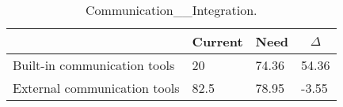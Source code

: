 
  \begin{table*}[]
  \centering
  \notsotiny
  \caption{ Communication__Integration.}
\label{tab:communication__integration}
\begin{tabular}{|l|l|l|l|}
  \hline
  \rowcolor[HTML]{C0C0C0}
    \multicolumn{1}{|c|}{Feature} & \multicolumn{1}{c|}{Current} & \multicolumn{1}{c|}{Need} & \multicolumn{1}{c|}{$\Delta$} \\ \hline
  Built-in communication tools & 20 & 74.36 & 54.36 \\ \hline 
External communication tools & 82.5 & 78.95 & -3.55 \\ \hline 
\end{tabular}%
  \end{table*}